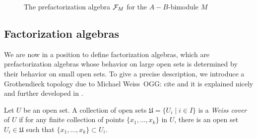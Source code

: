 \documentclass[11pt]{amsart}
\def\owen#1{{\textcolor{green!65!black}{OGG: {#1}}}}
\begin{document}
\begin{figure}
\begin{center}
\end{center}
\caption{The prefactorization algebra $\mathcal F_M$ for the $A-B$-bimodule $M$}
\label{fig:bimodasfact}
\end{figure}

\subsection{Factorization algebras}

We are now in a position to define factorization algebras,
which are prefactorization algebras whose behavior on large open sets is determined by their behavior on small open sets.
To give a precise description, we introduce a Grothendieck topology due to Michael Weiss~\owen{cite  \cite{Weiss} and it is explained nicely and further developed in \cite{BoavidaWeiss}}.

\begin{dfn}
Let $U$ be an open set. A collection of open sets $\mathfrak{U} = \{ U_i \mid i \in I\}$ is a {\em Weiss cover} of $U$ if for any finite collection of points $\{x_1,\ldots,x_k\}$ in $U$, there is an open set $U_i \in \mathfrak{U}$ such that $\{x_1,\ldots,x_k\} \subset U_i$.
\end{dfn}
\end{document}
